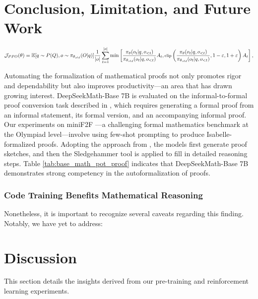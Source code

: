 \begin{itemize}[topsep=0pt]
\section{Conclusion, Limitation, and Future Work} 

\begin{equation}
\footnotesize
    \mathcal{J}_{PPO}(\theta) = \mathbb{E}{[q \sim P(Q), o \sim \pi_{\theta_{old}}(O|q)]} \frac{1}{|o|} \sum_{t=1}^{|o|} \min \left[ \frac{\pi_\theta(o_{t} | q, o_{<t})}{\pi_{\theta_{old}}(o_{t} | q, o_{<t})} A_{t}, \text{clip} \left( \frac{\pi_\theta(o_{t} | q, o_{<t})}{\pi_{\theta_{old}}(o_{t} | q, o_{<t})}, 1 - \varepsilon, 1 + \varepsilon \right)  A_{t} \right] ,
\end{equation}

Automating the formalization of mathematical proofs not only promotes rigor and dependability but also improves productivity—an area that has drawn growing interest. DeepSeekMath-Base 7B is evaluated on the informal-to-formal proof conversion task described in \citep{dsp_proof}, which requires generating a formal proof from an informal statement, its formal version, and an accompanying informal proof. Our experiments on miniF2F \citep{minif2f}—a challenging formal mathematics benchmark at the Olympiad level—involve using few-shot prompting to produce Isabelle-formalized proofs. Adopting the approach from \cite{dsp_proof}, the models first generate proof sketches, and then the Sledgehammer tool \citep{sledgehammer} is applied to fill in detailed reasoning steps. Table \ref{tab:base_math_pot_proof} indicates that DeepSeekMath-Base 7B demonstrates strong competency in the autoformalization of proofs.

\subsubsection{Code Training Benefits Mathematical Reasoning}

Nonetheless, it is important to recognize several caveats regarding this finding. Notably, we have yet to address:

\section{Discussion}
This section details the insights derived from our pre-training and reinforcement learning experiments.


\end{itemize}
